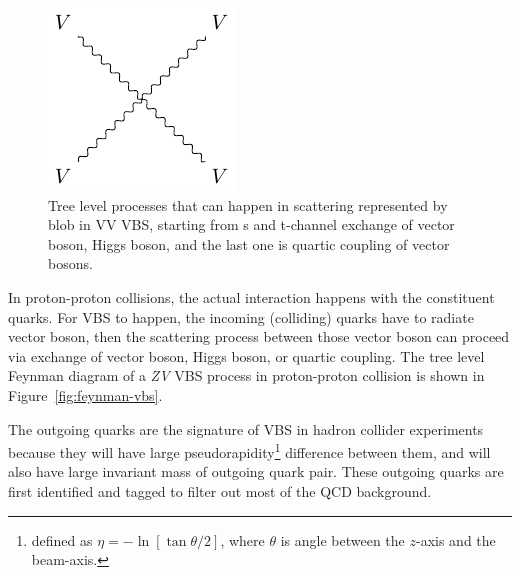 \begin{figure}[!ht]
\begin{minipage}{0.18\textwidth}
  \end{minipage}%
  \begin{minipage}{0.16\textwidth}
    \includegraphics[width=\textwidth]{figures/feyn_vbs_1.pdf}
  \end{minipage}
  \caption[Tree level processes that can happen in scattering represented by blob
    in VV VBS]%
  {Tree level processes that can happen in scattering represented by blob
    in VV VBS, starting from s and t-channel exchange of
    vector boson, Higgs boson, and the last one is quartic
    coupling of vector bosons.
  }%
  \label{fig:feynman-vbs-blob}
\end{figure}

In proton-proton collisions, the actual interaction happens
with the constituent quarks. For \gls{VBS} to happen, the incoming
(colliding) quarks have to radiate vector boson, then the scattering
process between those vector boson can proceed via exchange of vector
boson, Higgs boson, or quartic coupling. The tree level Feynman
diagram of a \textit{ZV} VBS process in proton-proton
collision is shown in Figure~\ref{fig:feynman-vbs}.

The outgoing quarks are the signature of \gls{VBS} in hadron collider
experiments because they will have large pseudorapidity\footnote{
  defined as \(\eta = - \ln[\tan \theta/2]\), where \(\theta \) is angle
  between the \(z\)-axis and the beam-axis. }
difference between
them, and will also have large invariant mass of outgoing quark pair.
These outgoing quarks are first identified
and tagged to filter out most of the \gls{QCD} background.

